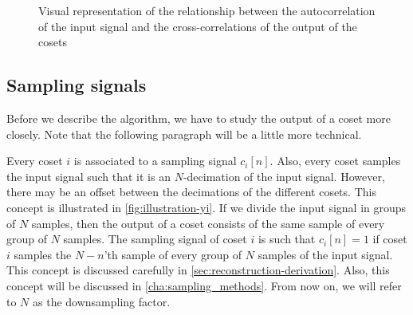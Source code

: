 \documentclass[a4paper, openany, oneside]{memoir}
\begin{document}
\begin{figure}[h]
\centering
{}
\caption{Visual representation of the relationship between the autocorrelation of the input signal and the cross-correlations of the output of the cosets}\label{tkz:overview-vars}
\end{figure}

\subsection{Sampling signals}
Before we describe the algorithm, we have to study the output of a coset more closely. Note that the following paragraph will be a little more technical.

Every coset $i$ is associated to a sampling signal $c_i[n]$. Also, every coset samples the input signal such that it is an $N$-decimation of the input signal. However, there may be an offset between the decimations of the different cosets. This concept is illustrated in \cref{fig:illustration-yi}. If we divide the input signal in groups of $N$ samples, then the output of a coset consists of the same sample of every group of $N$ samples.  The sampling signal of coset $i$ is such that $c_i[n]=1$ if coset $i$ samples the $N-n$'th sample of every group of $N$ samples of the input signal. This concept is discussed carefully in \cref{sec:reconstruction-derivation}. Also, this concept will be discussed in \cref{cha:sampling_methods}. From now on, we will refer to $N$ as the downsampling factor.
\end{document}
